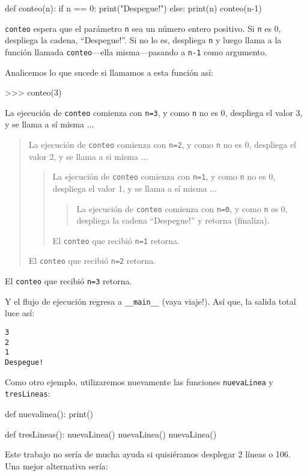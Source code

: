 \begin{pythoncode}
def conteo(n):
  if n == 0:
    print("Despegue!")
  else:
    print(n)
    conteo(n-1)
\end{pythoncode}

\texttt{conteo} espera que el parámetro \texttt{n} sea un número entero
positivo. Si \texttt{n} es 0, despliega la cadena, ``Despegue!''.
Si no lo es, despliega \texttt{n} y luego llama a la función llamada
\texttt{conteo}—ella misma—pasando a \texttt{n-1} como argumento.

Analicemos lo que sucede si llamamos a esta función así:
\begin{pyconcode}
>>> conteo(3)
\end{pyconcode}

La ejecución de \texttt{conteo} comienza con \texttt{n=3}, y como
\texttt{n} no es 0, despliega el valor 3, y se llama a sí misma ...
\begin{quote}
La ejecución de \texttt{conteo} comienza con \texttt{n=2}, y como
\texttt{n} no es 0, despliega el valor 2, y se llama a si misma ...

\begin{quote}
La ejecución de \texttt{conteo} comienza con \texttt{n=1}, y como
\texttt{n} no es 0, despliega el valor 1, y se llama a sí misma ...

\begin{quote}
La ejecución de \texttt{conteo} comienza con \texttt{n=0}, y como
\texttt{n} es 0, despliega la cadena ``Despegue!'' y retorna (finaliza). 
\end{quote}
El \texttt{conteo} que recibió \texttt{n=1} retorna. 
\end{quote}
El \texttt{conteo} que recibió \texttt{n=2} retorna. 
\end{quote}
El \texttt{conteo} que recibió \texttt{n=3} retorna.

Y el flujo de ejecución regresa a \texttt{\_\_main\_\_} (vaya viaje!).
Así que, la salida total luce así:
\begin{verbatim}
3
2
1
Despegue!
\end{verbatim}
Como otro ejemplo, utilizaremos nuevamente las funciones \texttt{nuevaLinea}
y \texttt{tresLineas}:

\begin{pythoncode}
def nuevalinea():
  print()

def tresLineas():
  nuevaLinea()
  nuevaLinea()
  nuevaLinea()
\end{pythoncode}

Este trabajo no sería de mucha ayuda si quisiéramos desplegar 2 líneas
o 106. Una mejor alternativa sería:

